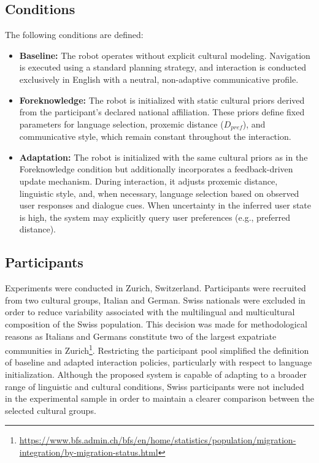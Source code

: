 \subsection{Conditions}
The following conditions are defined:
\begin{itemize}
\item \textbf{Baseline:} The robot operates without explicit cultural modeling. Navigation is executed using a standard planning strategy, and interaction is conducted exclusively in English with a neutral, non-adaptive communicative profile.

\item \textbf{Foreknowledge:} The robot is initialized with static cultural priors derived from the participant’s declared national affiliation. These priors define fixed parameters for language selection, proxemic distance ($D_{pref}$), and communicative style, which remain constant throughout the interaction.

\item \textbf{Adaptation:} The robot is initialized with the same cultural priors as in the Foreknowledge condition but additionally incorporates a feedback-driven update mechanism. During interaction, it adjusts proxemic distance, linguistic style, and, when necessary, language selection based on observed user responses and dialogue cues. When uncertainty in the inferred user state is high, the system may explicitly query user preferences (e.g., preferred distance).
\end{itemize}



\subsection{Participants}
\label{sec:participant}
Experiments were conducted in Zurich, Switzerland. Participants were recruited from two cultural groups, Italian and German. Swiss nationals were excluded in order to reduce variability associated with the multilingual and multicultural composition of the Swiss population. This decision was made for methodological reasons as Italians and Germans constitute two of the largest expatriate communities in Zurich\footnote{\href{https://www.bfs.admin.ch/bfs/en/home/statistics/population/migration-integration/by-migration-status.html}{https://www.bfs.admin.ch/bfs/en/home/statistics/population/migration-integration/by-migration-status.html}}. Restricting the participant pool simplified the definition of baseline and adapted interaction policies, particularly with respect to language initialization. Although the proposed system is capable of adapting to a broader range of linguistic and cultural conditions, Swiss participants were not included in the experimental sample in order to maintain a clearer comparison between the selected cultural groups.
\color{black}

